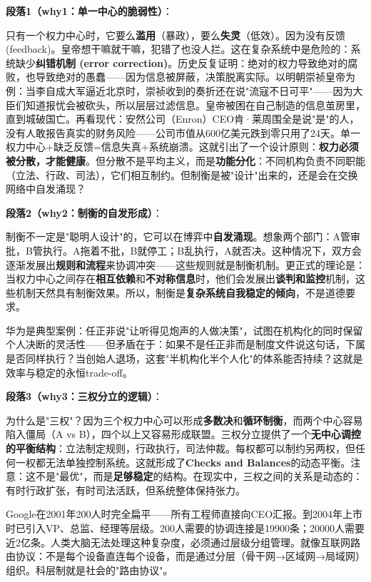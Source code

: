 \documentclass[../main.tex]{subfiles}
\begin{document}
	\textbf{段落1（why1：单一中心的脆弱性）}：  

	只有一个权力中心时，它要么\textbf{滥用}（暴政），要么\textbf{失灵}（低效）。因为没有反馈 (feedback)。皇帝想干嘛就干嘛，犯错了也没人拦。这在复杂系统中是危险的：系统缺少\textbf{纠错机制 (error correction)}。历史反复证明：绝对的权力导致绝对的腐败，也导致绝对的愚蠢——因为信息被屏蔽，决策脱离实际。以明朝崇祯皇帝为例：当李自成大军逼近北京时，崇祯收到的奏折还在说"流寇不日可平"——因为大臣们知道报忧会被砍头，所以层层过滤信息。皇帝被困在自己制造的信息茧房里，直到城破国亡。再看现代：安然公司（Enron）CEO肯·莱周围全是说"是"的人，没有人敢报告真实的财务风险——公司市值从600亿美元跌到零只用了24天。单一权力中心+缺乏反馈=信息失真+系统崩溃。这就引出了一个设计原则：\textbf{权力必须被分散，才能健康}。但分散不是平均主义，而是\textbf{功能分化}：不同机构负责不同职能（立法、行政、司法），它们相互制约。但制衡是被"设计"出来的，还是会在交换网络中自发涌现？
	
	\textbf{段落2（why2：制衡的自发形成）}：  

	制衡不一定是"聪明人设计"的，它可以在博弈中\textbf{自发涌现}。想象两个部门：A管审批，B管执行。A拖着不批，B就停工；B乱执行，A就否决。这种情况下，双方会逐渐发展出\textbf{规则和流程}来协调冲突——这些规则就是制衡机制。更正式的理论是：当权力中心之间存在\textbf{相互依赖}和\textbf{不对称信息}时，他们会发展出\textbf{谈判和监控}机制，这些机制天然具有制衡效果。所以，制衡是\textbf{复杂系统自我稳定的倾向}，不是道德要求。
	
	华为是典型案例：任正非说"让听得见炮声的人做决策"，试图在机构化的同时保留个人决断的灵活性——但矛盾在于：如果不是任正非而是制度文件说这句话，下属是否同样执行？当创始人退场，这套"半机构化半个人化"的体系能否持续？这就是效率与稳定的永恒trade-off。

	\textbf{段落3（why3：三权分立的逻辑）}：  

	为什么是"三权"？因为三个权力中心可以形成\textbf{多数决}和\textbf{循环制衡}，而两个中心容易陷入僵局（A vs B），四个以上又容易形成联盟。三权分立提供了一个\textbf{无中心调控的平衡结构}：立法制定规则，行政执行，司法仲裁。每权都可以制约另两权，但任何一权都无法单独控制系统。这就形成了\textbf{Checks and Balances}的动态平衡。注意：这不是"最优"，而是\textbf{足够稳定}的结构。在现实中，三权之间的关系是动态的：有时行政扩张，有时司法活跃，但系统整体保持张力。
	
	Google在2001年200人时完全扁平——所有工程师直接向CEO汇报。到2004年上市时已引入VP、总监、经理等层级。200人需要的协调连接是19900条；20000人需要近2亿条。人类大脑无法处理这种复杂度，必须通过层级分组管理。就像互联网路由协议：不是每个设备直连每个设备，而是通过分层（骨干网→区域网→局域网）组织。科层制就是社会的"路由协议"。
\end{document}
